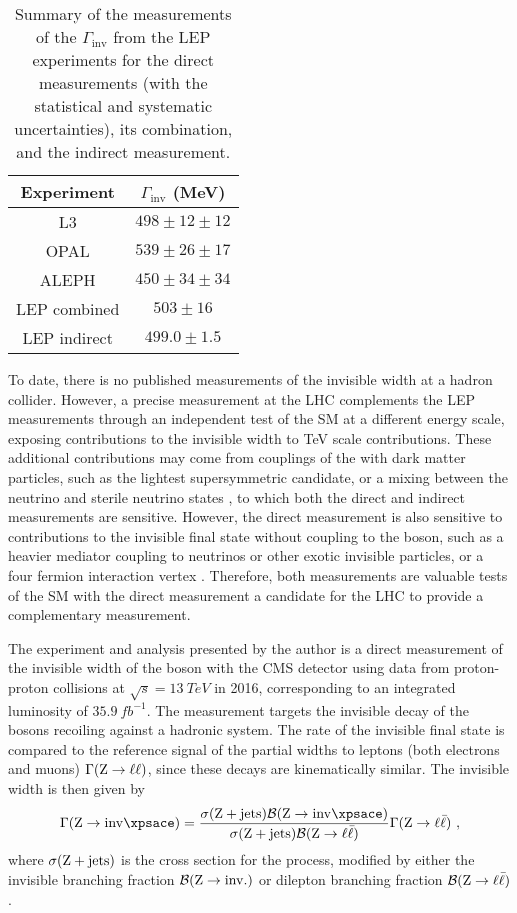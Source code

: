 \begin{table}[htb]
    \centering
    \begin{tabular}{cc}
         \hline\hline
         Experiment & $\Gamma_{\mathrm{inv}}$ (MeV) \\
         \hline
         L3 & $498\pm 12\pm 12$ \\
         OPAL & $539\pm 26\pm 17$ \\
         ALEPH & $450\pm 34\pm 34$ \\
         LEP combined & $503\pm 16$ \\
         \hline
         LEP indirect & $499.0\pm 1.5$ \\
         \hline
    \end{tabular}
    \caption{
        Summary of the measurements of the $\Gamma_{\mathrm{inv}}$ from the LEP experiments for the direct measurements (with the statistical and systematic uncertainties), its combination, and the indirect measurement.
    }
    \label{tab:lep-zinv-width}
\end{table}

To date, there is no published measurements of the \PZ invisible width at a hadron collider. However, a precise measurement at the LHC complements the LEP measurements through an independent test of the SM at a different energy scale, exposing contributions to the invisible width to TeV scale contributions. These additional contributions may come from couplings of the \PZ with dark matter particles, such as the lightest supersymmetric candidate, or a mixing between the neutrino and sterile neutrino states \cite{Carena:2003aj}, to which both the direct and indirect measurements are sensitive. However, the direct measurement is also sensitive to contributions to the invisible final state without coupling to the \PZ boson, such as a heavier mediator coupling to neutrinos or other exotic invisible particles, or a four fermion interaction vertex \cite{Carena:2003aj}.  Therefore, both measurements are valuable tests of the SM with the direct measurement a candidate for the LHC to provide a complementary measurement.

The experiment and analysis presented by the author is a direct measurement of the invisible width of the \PZ boson with the CMS detector using data from proton-proton collisions at ${\sqrt{s}=\SI{13}{TeV}}$ in 2016, corresponding to an integrated luminosity of $\SI{35.9}{fb^{-1}}$. The measurement targets the invisible decay of the \PZ bosons recoiling against a hadronic system. The rate of the invisible final state is compared to the reference signal of the partial widths to leptons (both electrons and muons) $\Gamma(\mathrm{Z}\rightarrow\ell\ell)$, since these decays are kinematically similar. The invisible width is then given by
%
\begin{equation}\label{eq:zinv}
    \Gamma(\IZinv) = \frac{\sigma(\IZj)\mathcal{B}(\IZinv)}{\sigma(\IZj)\mathcal{B}(\IZll)}\Gamma(\IZll)\ ,
\end{equation}
%
where $\sigma({\mathrm{Z}+\mathrm{jets}})$ is the cross section for the \IZj process, modified by either the invisible branching fraction $\mathcal{B}(\mathrm{Z}\rightarrow\mathrm{inv.})$ or dilepton branching fraction $\mathcal{B}({\mathrm{Z}\rightarrow \ell\bar{\ell}})$.
